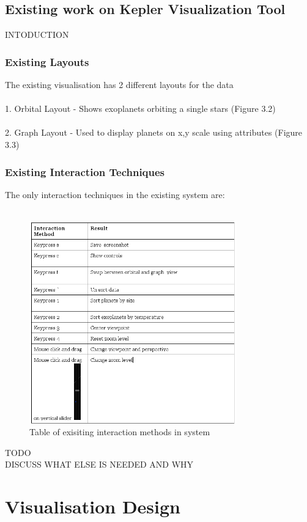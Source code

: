 \documentclass[11pt
              , a4paper
              , twoside
              , openright
              ]{report}
\begin{document}
\section{Existing work on Kepler Visualization Tool}
INTODUCTION
\subsection{Existing Layouts}
The existing visualisation has 2 different layouts for the data
\\\\
1. Orbital Layout - Shows exoplanets orbiting a single stars (Figure 3.2)
\\\\
2. Graph Layout - Used to display planets on x,y scale using attributes (Figure 3.3)

\subsection{Existing Interaction Techniques}
The only interaction techniques in the existing system are:
\\\\
\begin{figure}[h!]
  \centering
      \includegraphics[width=0.8\textwidth]{images/table.jpg}
  \caption{Table of exisiting interaction methods in system}
\end{figure}
TODO\\
DISCUSS WHAT ELSE IS NEEDED AND WHY

\chapter{Visualisation Design}
\end{document}
